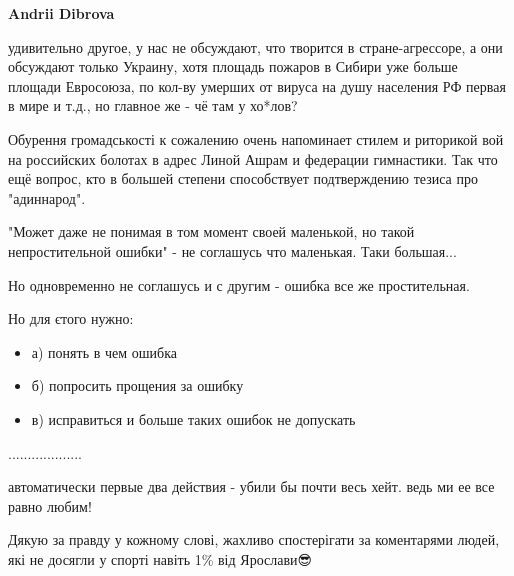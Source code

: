 \begin{itemize}
\begin{itemize}
\textbf{Andrii Dibrova} 

удивительно другое, у нас не обсуждают, что творится в
стране-агрессоре, а они обсуждают только Украину, хотя площадь пожаров в Сибири
уже больше площади Евросоюза, по кол-ву умерших от вируса на душу населения РФ
первая в мире и т.д., но главное же - чё там у хо*лов?
\end{itemize}

 

Обурення громадськості к сожалению очень напоминает стилем и риторикой вой на
российских болотах в адрес Линой Ашрам и федерации гимнастики. Так что ещё
вопрос, кто в большей степени способствует подтверждению тезиса про
"адиннарод".


 

"Может даже не понимая в том момент своей маленькой, но такой непростительной
ошибки" - не соглашусь что маленькая. Таки большая...

Но одновременно не соглашусь и с другим - ошибка все же простительная.

Но для єтого нужно:

\begin{itemize}
  \item а) понять в чем ошибка
  \item б) попросить прощения за ошибку
  \item в) исправиться и больше таких ошибок не допускать
\end{itemize}

...................

автоматически первые два действия - убили бы почти весь хейт. ведь ми ее все равно любим!

 
Дякую за правду у кожному слові, жахливо спостерігати за коментарями людей, які не досягли у спорті навіть 1\% від Ярослави😎


\end{itemize}
